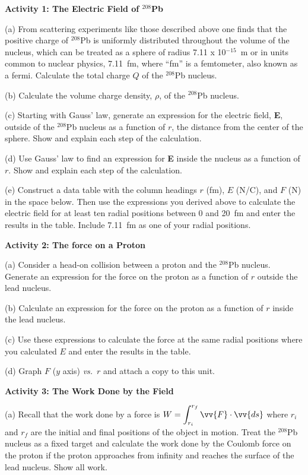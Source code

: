\bigskip
\textbf{Activity 1: The Electric Field of \( ^{208} \)Pb}

(a) From scattering experiments like those described above one finds
that the positive charge of \( ^{208} \)Pb is uniformly distributed
throughout the volume of the nucleus, which can be treated as a sphere
of radius 7.11 x 10\( ^{-15} \)~m or in units common to nuclear physics,
7.11~fm, where {}``fm'' is a femtometer, also known as a fermi. Calculate 
the total charge $Q$ of the \( ^{208} \)Pb nucleus.
\answerspace{30mm}

(b) Calculate the volume charge density, \( \rho  \), of the \( ^{208} \)Pb
nucleus.
\answerspace{30mm}

\pagebreak[2]
(c) Starting with Gauss' law, generate an expression for the electric
field, \textbf{E}, outside of the \( ^{208} \)Pb nucleus as a function
of $r$, the distance from the center of the sphere. Show and explain
each step of the calculation.
\answerspace{1.5in}

(d) Use Gauss' law to find an expression for \textbf{E} inside the
nucleus as a function of $r$. Show and explain each step of the calculation.
\answerspace{1.5in}

(e) Construct a data table with the column headings $r$ (fm), $E$ (N/C),
and $F$ (N) in the space below. Then use the expressions you derived
above to calculate the electric field for at least ten radial positions
between 0 and 20~fm and enter the results in the table. Include 7.11~fm 
as one of your radial positions.
\answerspace{2.3in}

\textbf{Activity 2: The force on a Proton}

(a) Consider a head-on collision between a proton and the \( ^{208} \)Pb
nucleus. Generate an expression for the force on the proton as a function
of $r$ outside the lead nucleus.
\answerspace{20mm}

\pagebreak[2]
(b) Calculate an expression for the force on the proton as a function
of $r$ inside the lead nucleus.
\answerspace{25mm}

(c) Use these expressions to calculate the force at the same radial
positions where you calculated $E$ and enter the results in the table.

(d) Graph $F$ ($y$ axis) \textit{vs.}~$r$ and attach a copy to this unit.
\answerspace{10mm}

\textbf{Activity 3: The Work Done by the Field}

(a) Recall that the work done by a force is $\displaystyle W=\int ^{r_{f}}_{r_{i}}\vv{F}\cdot \vv{ds}$
where $r_{i}$ and $r_f$ are the initial and final positions
of the object in motion. Treat the \( ^{208} \)Pb nucleus as a fixed
target and calculate the work done by the Coulomb force on the proton
if the proton approaches from infinity and reaches the surface of
the lead nucleus. Show all work.
\answerspace{35mm}

